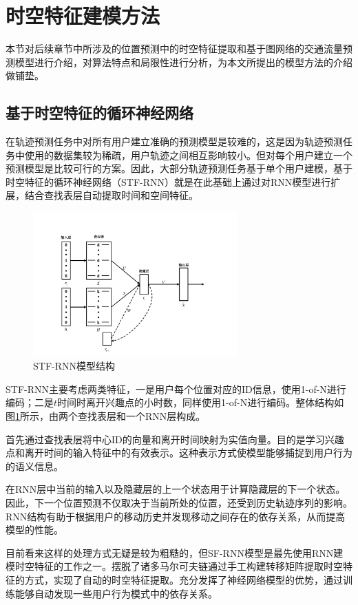 \documentclass[master]{thesis-uestc}
\begin{document}
\section{时空特征建模方法}
本节对后续章节中所涉及的位置预测中的时空特征提取和基于图网络的交通流量预测模型进行介绍，对算法特点和局限性进行分析，为本文所提出的模型方法的介绍做铺垫。

\subsection{基于时空特征的循环神经网络}
在轨迹预测任务中对所有用户建立准确的预测模型是较难的，这是因为轨迹预测任务中使用的数据集较为稀疏，用户轨迹之间相互影响较小。但对每个用户建立一个预测模型是比较可行的方案。因此，大部分轨迹预测任务基于单个用户建模，基于时空特征的循环神经网络（STF-RNN）就是在此基础上通过对RNN模型进行扩展，结合查找表层自动提取时间和空间特征。

\begin{figure}[!ht]
\centering 
\includegraphics[width=0.7\textwidth]{./pic/stf-rnn.pdf}
\caption{STF-RNN模型结构}
\label{Figure.2.10}
\end{figure}
STF-RNN主要考虑两类特征，一是用户每个位置对应的ID信息，使用1-of-N进行编码；二是$t$时间时离开兴趣点的小时数，同样使用1-of-N进行编码。整体结构如图\ref{Figure.2.10}所示，由两个查找表层和一个RNN层构成。

首先通过查找表层将中心ID的向量和离开时间映射为实值向量。目的是学习兴趣点和离开时间的输入特征中的有效表示。这种表示方式使模型能够捕捉到用户行为的语义信息。

在RNN层中当前的输入以及隐藏层的上一个状态用于计算隐藏层的下一个状态。因此，下一个位置预测不仅取决于当前所处的位置，还受到历史轨迹序列的影响。RNN结构有助于根据用户的移动历史并发现移动之间存在的依存关系，从而提高模型的性能。

目前看来这样的处理方式无疑是较为粗糙的，但SF-RNN模型是最先使用RNN建模时空特征的工作之一。摆脱了诸多马尔可夫链通过手工构建转移矩阵提取时空特征的方式，实现了自动的时空特征提取。充分发挥了神经网络模型的优势，通过训练能够自动发现一些用户行为模式中的依存关系。
\end{document}
